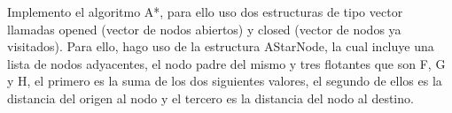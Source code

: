 Implemento el algoritmo A*, para ello uso dos estructuras de tipo vector llamadas opened (vector de nodos abiertos) y closed (vector de nodos ya visitados). Para ello, hago uso de la estructura AStarNode, la cual incluye una lista de nodos adyacentes, el nodo padre del mismo y tres flotantes que son F, G y H, el primero es la suma de los dos siguientes valores, el segundo de ellos es la distancia del origen al nodo y el tercero es la distancia del nodo al destino.